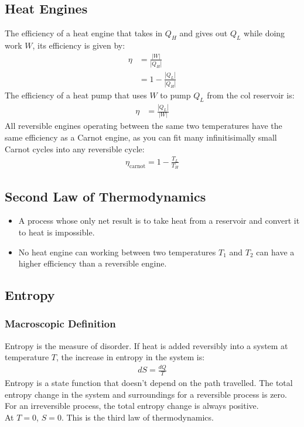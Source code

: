 \documentclass[11pt, letterpaper]{article}
\begin{document}
\begin{multicols*}{3}
\subsection{Heat Engines}
The efficiency of a heat engine that takes in $Q_H$ and gives out $Q_L$ while
doing work $W$, its efficiency is given by:
\begin{align*}
  \eta &= \frac{|W|}{|Q_H|} \\
  &= 1 - \frac{|Q_L|}{|Q_H|}
\end{align*}
The efficiency of a heat pump that uses $W$ to pump $Q_L$ from the col reservoir
is:
\begin{align*}
  \eta &= \frac{|Q_L|}{|W|}
\end{align*}
All reversible engines operating between the same two temperatures have the same
efficiency as a Carnot engine, as you can fit many infinitisimally small Carnot
cycles into any reversible cycle:
\begin{align*}
  \eta_{\text{carnot}} = 1 - \frac{T_L}{T_H}
\end{align*}
\subsection{Second Law of Thermodynamics}
\begin{itemize}
\item A process whose only net result is to take heat from a reservoir and
  convert it to heat is impossible.
\item No heat engine can working between two temperatures $T_1$ and $T_2$ can
  have a higher efficiency than a reversible engine.
\end{itemize}
\subsection{Entropy}
\subsubsection{Macroscopic Definition}
Entropy is the measure of disorder. If heat is added reversibly into a system at
temperature $T$, the increase in entropy in the system is:
\begin{align*}
  dS = \frac{dQ}{T}
\end{align*}
Entropy is a state function that doesn't depend on the path travelled. The total
entropy change in the system and surroundings for a reversible process is
zero. For an irreversible process, the total entropy change is always positive.
\\
\noindent
At $T=0$, $S=0$. This is the third law of thermodynamics.

\end{multicols*}
\end{document}
